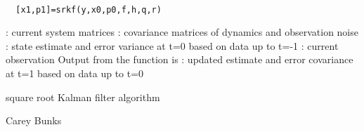 
\begin{mandesc}
   \\ %
\end{mandesc}
\begin{calling_sequence}
\begin{verbatim}
  [x1,p1]=srkf(y,x0,p0,f,h,q,r)  
\end{verbatim}
\end{calling_sequence}
\begin{parameters}
  \begin{varlist}
    : current system matrices
    : covariance matrices of dynamics and observation noise
    : state estimate and error variance at t=0 based on data up to t=-1
    : current observation Output from the function is
    : updated estimate and error covariance at t=1 based on data up to t=0
  \end{varlist}
\end{parameters}
\begin{mandescription}
  square root Kalman filter algorithm
\end{mandescription}
\begin{authors}
  Carey Bunks
\end{authors}
